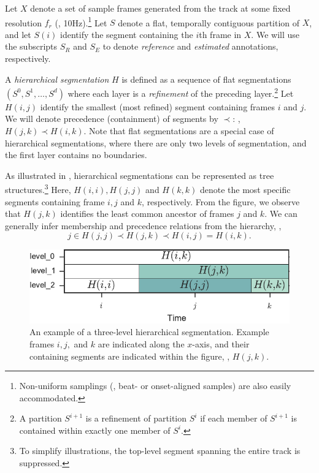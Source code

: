 \documentclass{article}
\begin{document}
Let $X$ denote a set of sample frames generated from the track at some fixed resolution $f_r$ (\eg,
10Hz).\footnote{Non-uniform samplings (\eg, beat- or onset-aligned samples) are also easily accommodated.}
Let $S $ denote a flat, temporally contiguous partition of $X$,
and let $S(i)$ identify the segment containing the $i$th frame in $X$.
We will use the subscripts $S_R$ and $S_E$ to denote \emph{reference} and \emph{estimated} annotations, respectively.

A \emph{hierarchical segmentation} $H$ is defined as a sequence of flat segmentations $(S^0, S^1, \dots, S^d)$ where each layer is a \emph{refinement}
of the preceding layer.\footnote{A partition $S^{i+1}$ is a refinement of partition $S^{i}$ if each member of $S^{i+1}$ is contained within exactly one member of $S^i$.}
Let $H(i,j)$ identify the smallest (most refined) segment containing frames $i$ and $j$.
We will denote precedence (containment) of segments by $\prec$: \eg, $H(j, k) \prec H(i, k)$.
Note that flat segmentations are a special case of hierarchical segmentations, where there are only two
levels of segmentation, and the first layer contains no boundaries.

As illustrated in , hierarchical segmentations can be represented as tree structures.\footnote{To simplify illustrations, 
the top-level segment spanning the entire track is suppressed.}
Here, $H(i, i), H(j, j)$ and $H(k,k)$ denote the most specific segments containing frame $i, j$ and $k$,
respectively.
From the figure, we observe that $H(j,k)$ identifies the least common ancestor of frames $j$ and $k$.
We can generally infer membership and precedence relations from the hierarchy, \eg,
\begin{equation}
j \in H(j, j) \prec H(j, k) \prec H(i, j) = H(i, k).
\end{equation}


\begin{figure}
  \centering
  \includegraphics[width=\columnwidth]{figs/hier-example.pdf}
  \caption{An example of a three-level hierarchical segmentation.
  Example frames $i, j,$ and $k$ are indicated along the $x$-axis, and their containing segments are indicated
  within the figure, \eg, $H(j, k)$.}
  \label{fig:hier-example}
\end{figure}
\end{document}

